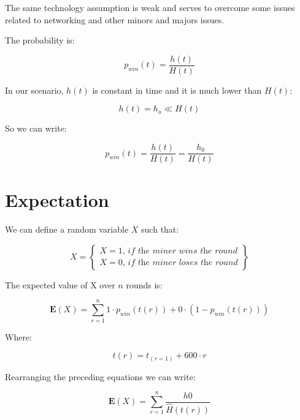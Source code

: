 \documentclass{book}
\theoremstyle{definition}
\begin{document}
The same technology assumption is weak and serves to overcome some issues related to networking and other minors and majors issues.

The probability is:

\begin{equation}
    p_{win}(t) = \frac{h(t)}{H(t)} \label{eq2}
\end{equation}

In our scenario, $h(t)$ is constant in time and it is much lower than $H(t)$: 

\begin{equation}
    h(t) = h_{o} \ll H(t) \label{eq3}
\end{equation}

So we can write:

\begin{equation}
    p_{win}(t) = \frac{h(t)}{H(t)} = \frac{h_{0}}{H(t)} \label{eq4}
\end{equation}

\section{Expectation}

We can define a random variable $X$ such that:

\begin{equation}
X = \left\{
        \begin{array}{ll}
            X = 1 \textit{, if the miner wins the round} \\
            X = 0 \textit{, if the miner loses the round}
        \end{array}
    \right \} \label{rndX}
\end{equation}

The expected value of X over $n$ rounds is:

\begin{equation}
    \mathbf{E}(X) = \displaystyle\sum_{r=1}^{n} 1 \cdot p_{win}(t(r)) + 0 \cdot ( 1 - p_{win}(t(r))) \label{eq5}
\end{equation}

Where:

\begin{equation}
    t(r) = t_{(r=1)} + 600 \cdot r \label{eq6}
\end{equation}

Rearranging the preceding equations we can write:

\begin{equation}
    \mathbf{E}(X) = \displaystyle\sum_{r=1}^{n} \frac{h0}{\widehat{H}(t(r))} \label{expectationPwinOverRounds}
\end{equation}
\end{document}
